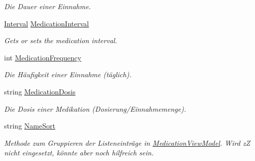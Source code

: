 \begin{DoxyCompactItemize}
\begin{DoxyCompactList}\small\item\em Die Dauer einer Einnahme. \end{DoxyCompactList}\item 
\mbox{\hyperlink{namespacemy_m_d_1_1_model_interface_1_1_data_model_interface_ad48afcd64f57a7b985ed525a6c054782}{Interval}} \mbox{\hyperlink{classmy_m_d_1_1_view_model_1_1_medication_tab_view_model_1_1_medicine_view_model_a82fd4edb65b7e0afffe027f29217ac80}{Medication\+Interval}}
\begin{DoxyCompactList}\small\item\em Gets or sets the medication interval. \end{DoxyCompactList}\item 
int \mbox{\hyperlink{classmy_m_d_1_1_view_model_1_1_medication_tab_view_model_1_1_medicine_view_model_ae6da5aa4432c4c03b46d10b86b78511e}{Medication\+Frequency}}
\begin{DoxyCompactList}\small\item\em Die Häufigkeit einer Einnahme (täglich). \end{DoxyCompactList}\item 
string \mbox{\hyperlink{classmy_m_d_1_1_view_model_1_1_medication_tab_view_model_1_1_medicine_view_model_a01719d12c8718f0b11666205215f53fd}{Medication\+Dosis}}
\begin{DoxyCompactList}\small\item\em Die Dosis einer Medikation (Dosierung/\+Einnahmemenge). \end{DoxyCompactList}\item 
string \mbox{\hyperlink{classmy_m_d_1_1_view_model_1_1_medication_tab_view_model_1_1_medicine_view_model_a93c6d3fe1297957deadbd1dc0d29475a}{Name\+Sort}}
\begin{DoxyCompactList}\small\item\em Methode zum Gruppieren der Listeneinträge in \mbox{\hyperlink{classmy_m_d_1_1_view_model_1_1_medication_tab_view_model_1_1_medication_view_model}{Medication\+View\+Model}}. Wird zZ nicht eingesetzt, könnte aber noch hilfreich sein. \end{DoxyCompactList}\end{DoxyCompactItemize}
